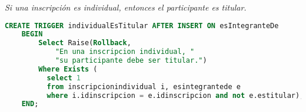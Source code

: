 \emph{Si una inscripción es individual, entonces el participante es titular.}

\begin{lstlisting}[language=SQL]
CREATE TRIGGER individualEsTitular AFTER INSERT ON esIntegranteDe
    BEGIN
        Select Raise(Rollback,
            "En una inscripcion individual, "
            "su participante debe ser titular.")
        Where Exists (
          select 1
          from inscripcionindividual i, esintegrantede e
          where i.idinscripcion = e.idinscripcion and not e.estitular);
    END;
\end{lstlisting}

